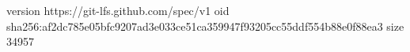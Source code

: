 version https://git-lfs.github.com/spec/v1
oid sha256:af2dc785e05bfc9207ad3e033ce51ca359947f93205cc55ddf554b88e0f88ea3
size 34957
